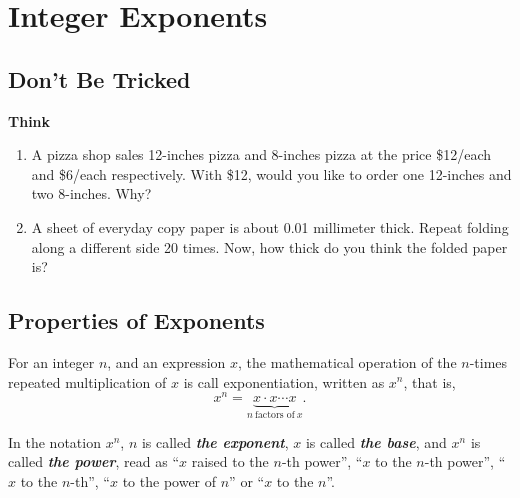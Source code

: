 \documentclass[en,12pt]{elegantbook}
\newenvironment{rmdthink}{
	\par\noindent
	{
		\makebox[-\width][r]{
			\footnotesize
			\color{green!90}\faLightbulbO
			\hspace*{3pt}
		}
			\textbf{
				\color{second}
				Think 
			}
    }
    \begin{shaded}
    \sffamily
}{
    \par\medskip\ignorespacesafterend
    \end{shaded}
}
\begin{document}
\hypertarget{integer-exponents}{%
\chapter{Integer Exponents}\label{integer-exponents}}

\hypertarget{dont-be-tricked}{%
\section{Don't Be Tricked}\label{dont-be-tricked}}

\begin{rmdthink}

\begin{enumerate}
\def\labelenumi{\arabic{enumi}.}
\item
  A pizza shop sales 12-inches pizza and 8-inches pizza at the price \$12/each and \$6/each respectively. With \$12, would you like to order one 12-inches and two 8-inches. Why?
\item
  A sheet of everyday copy paper is about 0.01 millimeter thick. Repeat folding along a different side 20 times. Now, how thick do you think the folded paper is?
\end{enumerate}

\end{rmdthink}

\hypertarget{properties-of-exponents}{%
\section{Properties of Exponents}\label{properties-of-exponents}}

For an integer \(n\), and an expression \(x\), the mathematical operation of the \(n\)-times repeated multiplication of \(x\) is call exponentiation, written as \(x^n\), that is,
\[
x^n=\underbrace{x\cdot x \cdots x}_{n~\text{factors of}~x}.
\]

In the notation \(x^n\), \(n\) is called \textbf{\emph{the exponent}}, \(x\) is called \textbf{\emph{the base}}, and \(x^n\) is called \textbf{\emph{the power}}, read as ``\(x\) raised to the \(n\)-th power'', ``\(x\) to the \(n\)-th power'', ``\(x\) to the \(n\)-th'', ``\(x\) to the power of \(n\)'' or ``\(x\) to the \(n\)''.
\end{document}
